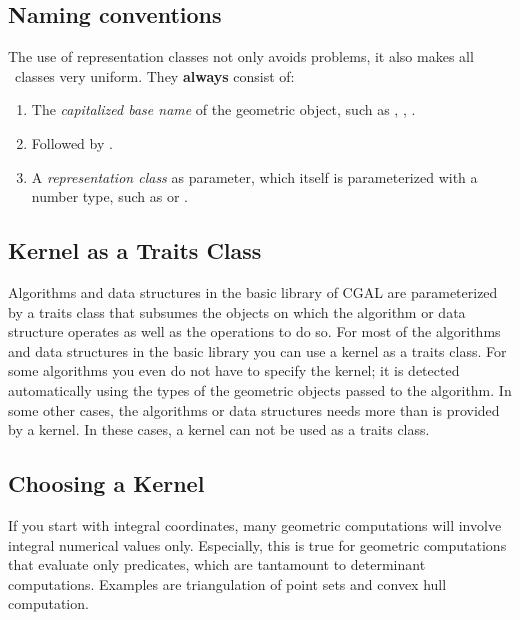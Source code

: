 \subsection{Naming conventions}

The use of representation classes not only avoids problems, it also
makes all \cgal\ classes very uniform. They {\bf always} consist of:
\begin{enumerate}
\begin{ccTexOnly}
\itemsep0pt\parskip0pt
\end{ccTexOnly}

\item The {\em capitalized base name} of the geometric object, such as
  , , .

\item Followed by .
  
\item A {\em representation class} as parameter, which itself is
  parameterized with a number type, such as
   or .
\end{enumerate}

\subsection{Kernel as a Traits Class}

Algorithms and data structures in the basic library of CGAL are
parameterized by a traits class that subsumes the objects on which the
algorithm or data structure operates as well as the operations to do
so. For most of the algorithms and data structures in the basic
library you can use a kernel as a traits class. For some algorithms
you even do not have to specify the kernel; it is detected
automatically using the types of the geometric objects passed to the
algorithm. In some other cases, the algorithms or data structures
needs more than is provided by a kernel. In these cases, a kernel can
not be used as a traits class.

\subsection{Choosing a Kernel}

If you start with integral  coordinates,
many geometric computations will involve integral numerical values
only. Especially, this is true for geometric computations that
evaluate only predicates, which are tantamount to determinant
computations. Examples are triangulation of point sets and convex hull
computation.  

